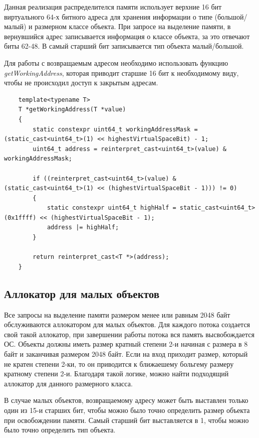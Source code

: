 Данная реализация распределителся памяти использует верхние 16 бит виртуального 64-х битного адреса для хранения информации о типе (большой/малый) и размерном классе объекта. При запросе на выделение памяти, в вернувшийся адрес записывается информация о классе объекта, за это отвечают биты 62-48. В самый старший бит записывается тип объекта малый/большой.\cite{page-tables}

Для работы с возвращаемым адресом необходимо использовать функцию \textit{getWorkingAddress}, которая приводит старшие 16 бит к необходимому виду, чтобы не происходил доступ к закрытым адресам.

\begin{lstlisting}
	template<typename T>
	T *getWorkingAddress(T *value)
	{
		static constexpr uint64_t workingAddressMask = (static_cast<uint64_t>(1) << highestVirtualSpaceBit) - 1;
		uint64_t address = reinterpret_cast<uint64_t>(value) & workingAddressMask;
		
		if ((reinterpret_cast<uint64_t>(value) & (static_cast<uint64_t>(1) << (highestVirtualSpaceBit - 1))) != 0)
		{
			static constexpr uint64_t highHalf = static_cast<uint64_t>(0x1ffff) << (highestVirtualSpaceBit - 1);
			address |= highHalf;
		}
		
		return reinterpret_cast<T *>(address);
	}
\end{lstlisting}

\subsection{Аллокатор для малых объектов}
Все запросы на выделение памяти размером менее или равным 2048 байт обслуживаются аллокатором для малых объектов. Для каждого потока создается свой такой аллокатор, при завершении работы потока вся память высвобождается ОС. Объекты должны иметь размер кратный степени 2-и начиная с размера в 8 байт и заканчивая размером 2048 байт. Если на вход приходит размер, который не кратен степени 2-ки, то он приводится к ближаешему больгему размеру кратному степени 2-и. Благодаря такой логике, можно найти подходящий аллокатор для данного размерного класса.

В случае малых объектов, возвращаемому адресу может быть выставлен только один из 15-и старших бит, чтобы можно было точно определить размер объекта при освобождении памяти. Самый старший бит выставляется в 1, чтобы можно было точно определить тип объекта.

